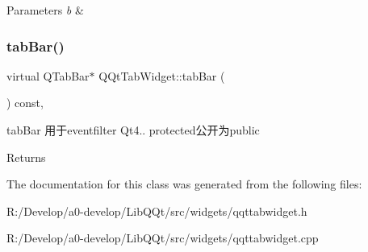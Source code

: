 \begin{DoxyParams}{Parameters}
{\em b} & \\
\hline
\end{DoxyParams}
\mbox{\label{class_q_qt_tab_widget_a3785188e6017cb3d449aed554bb12c9a}} 
\subsubsection{\texorpdfstring{tab\+Bar()}{tabBar()}}
{\footnotesize\ttfamily virtual Q\+Tab\+Bar$\ast$ Q\+Qt\+Tab\+Widget\+::tab\+Bar (\begin{DoxyParamCaption}{ }\end{DoxyParamCaption}) const\hspace{0.3cm}{\ttfamily [inline]}, {\ttfamily [virtual]}}



tab\+Bar 用于eventfilter Qt4.. protected公开为public 

\begin{DoxyReturn}{Returns}

\end{DoxyReturn}


The documentation for this class was generated from the following files\+:\begin{DoxyCompactItemize}
\item 
R\+:/\+Develop/a0-\/develop/\+Lib\+Q\+Qt/src/widgets/qqttabwidget.\+h\item 
R\+:/\+Develop/a0-\/develop/\+Lib\+Q\+Qt/src/widgets/qqttabwidget.\+cpp\end{DoxyCompactItemize}
